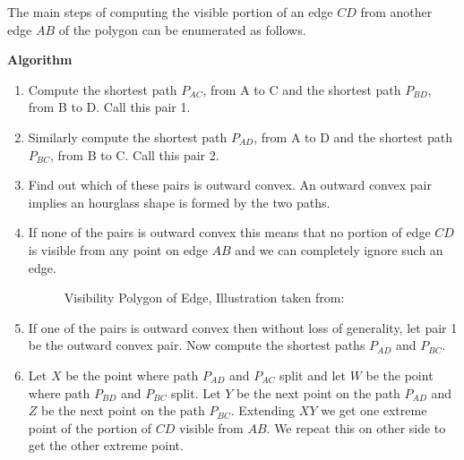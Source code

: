 The main steps of computing the visible portion of an edge $CD$ from another edge $AB$ of the polygon can be enumerated as follows.

{\bf Algorithm}



\begin{enumerate}
\item
Compute the shortest path $P_{AC}$, from A to C and the shortest path $P_{BD}$, from B to D. Call this pair 1.
\item
Similarly compute the shortest path  $P_{AD}$, from A to D and the shortest path  $P_{BC}$,  from B to C. Call this pair 2.
\item
Find out which of these pairs is outward convex. An outward convex pair implies an hourglass shape is formed by the two paths.
\item
If none of the pairs is outward convex this means that no portion of edge $CD$ is visible from any point on edge $AB$ and we can 
completely ignore such an edge.

\begin{figure}[h]
\begin{center}
\caption{\label{fig:Visibility Polygon of Edge}Visibility Polygon of Edge, Illustration taken from:\cite{key3}}
\end{center}
\end{figure}

\item
If one of the pairs is outward convex then without loss of generality, let pair 1 be the outward convex pair. Now compute the shortest 
paths  $P_{AD}$ and  $P_{BC}$.

\item
Let $X$ be the point where path $P_{AD}$ and $P_{AC}$ split and let  $W$ be the point where path $P_{BD}$ and $P_{BC}$ split. Let $Y$ be
the next point on the path  $P_{AD}$ and $Z$ be the next point on the path   $P_{BC}$. Extending $XY$ we get one extreme point of the 
portion of $CD$ visible from $AB$. We repeat this on other side to get the other extreme point.


\end{enumerate}

